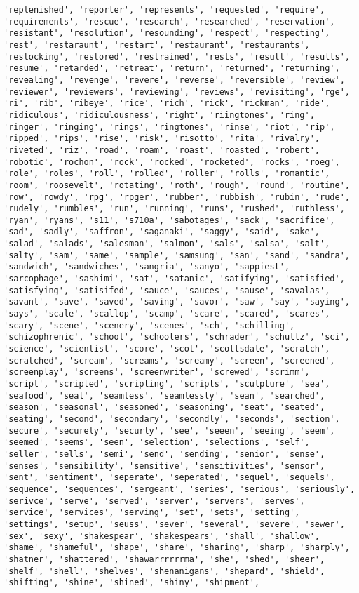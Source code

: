 \documentclass[11pt]{article}
\begin{document}
\begin{Verbatim}[commandchars=\\\{\}]
'replenished', 'reporter', 'represents', 'requested', 'require', 'requirements', 'rescue', 'research', 'researched', 'reservation', 'resistant', 'resolution', 'resounding', 'respect', 'respecting', 'rest', 'restaraunt', 'restart', 'restaurant', 'restaurants', 'restocking', 'restored', 'restrained', 'rests', 'result', 'results', 'resume', 'retarded', 'retreat', 'return', 'returned', 'returning', 'revealing', 'revenge', 'revere', 'reverse', 'reversible', 'review', 'reviewer', 'reviewers', 'reviewing', 'reviews', 'revisiting', 'rge', 'ri', 'rib', 'ribeye', 'rice', 'rich', 'rick', 'rickman', 'ride', 'ridiculous', 'ridiculousness', 'right', 'riingtones', 'ring', 'ringer', 'ringing', 'rings', 'ringtones', 'rinse', 'riot', 'rip', 'ripped', 'rips', 'rise', 'risk', 'risotto', 'rita', 'rivalry', 'riveted', 'riz', 'road', 'roam', 'roast', 'roasted', 'robert', 'robotic', 'rochon', 'rock', 'rocked', 'rocketed', 'rocks', 'roeg', 'role', 'roles', 'roll', 'rolled', 'roller', 'rolls', 'romantic', 'room', 'roosevelt', 'rotating', 'roth', 'rough', 'round', 'routine', 'row', 'rowdy', 'rpg', 'rpger', 'rubber', 'rubbish', 'rubin', 'rude', 'rudely', 'rumbles', 'run', 'running', 'runs', 'rushed', 'ruthless', 'ryan', 'ryans', 's11', 's710a', 'sabotages', 'sack', 'sacrifice', 'sad', 'sadly', 'saffron', 'saganaki', 'saggy', 'said', 'sake', 'salad', 'salads', 'salesman', 'salmon', 'sals', 'salsa', 'salt', 'salty', 'sam', 'same', 'sample', 'samsung', 'san', 'sand', 'sandra', 'sandwich', 'sandwiches', 'sangria', 'sanyo', 'sappiest', 'sarcophage', 'sashimi', 'sat', 'satanic', 'satifying', 'satisfied', 'satisfying', 'satisifed', 'sauce', 'sauces', 'sause', 'savalas', 'savant', 'save', 'saved', 'saving', 'savor', 'saw', 'say', 'saying', 'says', 'scale', 'scallop', 'scamp', 'scare', 'scared', 'scares', 'scary', 'scene', 'scenery', 'scenes', 'sch', 'schilling', 'schizophrenic', 'school', 'schoolers', 'schrader', 'schultz', 'sci', 'science', 'scientist', 'score', 'scot', 'scottsdale', 'scratch', 'scratched', 'scream', 'screams', 'screamy', 'screen', 'screened', 'screenplay', 'screens', 'screenwriter', 'screwed', 'scrimm', 'script', 'scripted', 'scripting', 'scripts', 'sculpture', 'sea', 'seafood', 'seal', 'seamless', 'seamlessly', 'sean', 'searched', 'season', 'seasonal', 'seasoned', 'seasoning', 'seat', 'seated', 'seating', 'second', 'secondary', 'secondly', 'seconds', 'section', 'secure', 'securely', 'securly', 'see', 'seeen', 'seeing', 'seem', 'seemed', 'seems', 'seen', 'selection', 'selections', 'self', 'seller', 'sells', 'semi', 'send', 'sending', 'senior', 'sense', 'senses', 'sensibility', 'sensitive', 'sensitivities', 'sensor', 'sent', 'sentiment', 'seperate', 'seperated', 'sequel', 'sequels', 'sequence', 'sequences', 'sergeant', 'series', 'serious', 'seriously', 'serivce', 'serve', 'served', 'server', 'servers', 'serves', 'service', 'services', 'serving', 'set', 'sets', 'setting', 'settings', 'setup', 'seuss', 'sever', 'several', 'severe', 'sewer', 'sex', 'sexy', 'shakespear', 'shakespears', 'shall', 'shallow', 'shame', 'shameful', 'shape', 'share', 'sharing', 'sharp', 'sharply', 'shatner', 'shattered', 'shawarrrrrrma', 'she', 'shed', 'sheer', 'shelf', 'shell', 'shelves', 'shenanigans', 'shepard', 'shield', 'shifting', 'shine', 'shined', 'shiny', 'shipment', 
\end{Verbatim}
\end{document}
